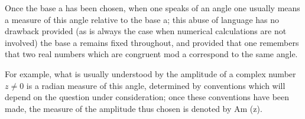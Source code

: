 Once the base a has been chosen, when one speaks of an angle one usually means a measure of this angle relative to the base a; this abuse of language has no drawback provided (as is always the case when numerical calculations are not involved) the base a remains fixed throughout, and provided that one remembers that two real numbers which are congruent mod a correspond to the same angle.

For example, what is usually understood by the amplitude of a complex number \(z \neq 0\) is a radian measure of this angle, determined by conventions which will depend on the question under consideration; once these conventions have been made, the measure of the amplitude thus chosen is denoted by Am (z).

